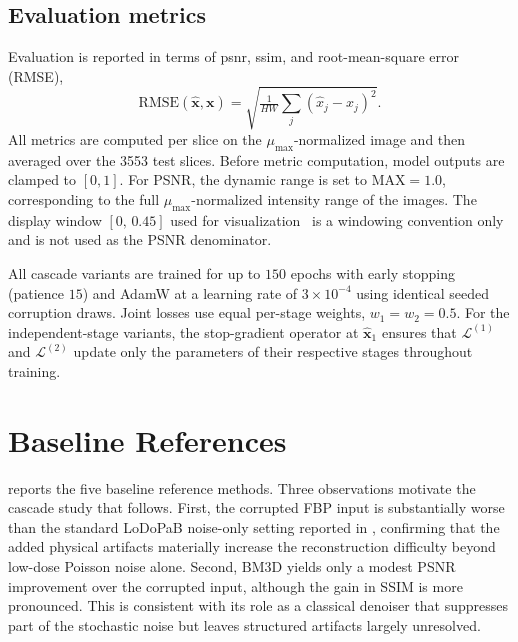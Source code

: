 \subsection{Evaluation metrics}
\label{subsec:exp_metrics}

Evaluation is reported in terms of \gls{psnr}, \gls{ssim}, and root-mean-square error (RMSE),
\begin{equation}
    \mathrm{RMSE}(\hat{\mathbf{x}}, \mathbf{x})
    = \sqrt{\tfrac{1}{HW}\sum_j (\hat{x}_j - x_j)^2}.
    \label{eq:exp_rmse}
\end{equation}
All metrics are computed per slice on the $\mu_{\max}$-normalized image and then averaged over the \num{3553} test slices. Before metric computation, model outputs are clamped to $[0,1]$. For PSNR, the dynamic range is set to $\mathrm{MAX}=1.0$, corresponding to the full $\mu_{\max}$-normalized intensity range of the images. The display window $[0,\,0.45]$ used for visualization~\cite{Leuschner2021, Kiss2024} is a windowing convention only and is not used as the PSNR denominator.

All cascade variants are trained for up to $150$ epochs with early stopping (patience $15$) and AdamW at a learning rate of $3\times 10^{-4}$ using identical seeded corruption draws. Joint losses use equal per-stage weights, $w_1 = w_2 = 0.5$. For the independent-stage variants, the stop-gradient operator at $\hat{\mathbf{x}}_1$ ensures that $\mathcal{L}^{(1)}$ and $\mathcal{L}^{(2)}$ update only the parameters of their respective stages throughout training.
\section{Baseline References}
\label{sec:exp_baselines_table}

 reports the five baseline reference methods.
Three observations motivate the cascade study that follows. First, the corrupted FBP input is substantially worse than the standard LoDoPaB noise-only setting reported in \cite{Leuschner2021}, confirming that the added physical artifacts materially increase the reconstruction difficulty beyond low-dose Poisson noise alone. Second, BM3D yields only a modest PSNR improvement over the corrupted input, although the gain in SSIM is more pronounced. This is consistent with its role as a classical denoiser that suppresses part of the stochastic noise but leaves structured artifacts largely unresolved.

